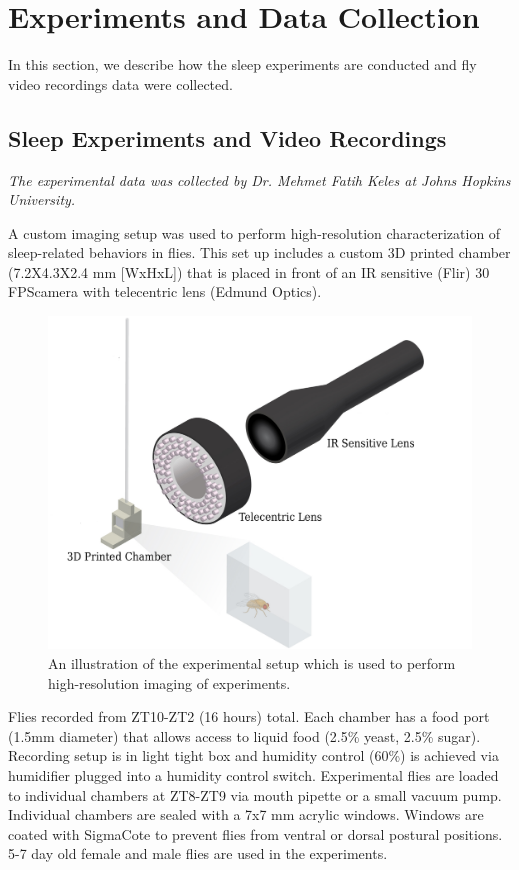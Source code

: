 \chapter{Experiments and Data Collection}\label{chapter:expt-data-collection}
In this section, we describe how the sleep experiments are conducted and fly video recordings data were collected.

\section{Sleep Experiments and Video Recordings}

\textit{The experimental data was collected by Dr. Mehmet Fatih Keles at Johns Hopkins University.}

A custom imaging setup was used to perform high-resolution characterization of sleep-related behaviors in flies. This set up includes a custom 3D printed chamber (7.2X4.3X2.4 mm [WxHxL]) that is placed in front of an IR sensitive (Flir) 30 FPScamera with telecentric lens (Edmund Optics).

\begin{figure}[ht!]
	\centering
	\includegraphics[width=0.75\linewidth]{figures/ExperimentalSetup.pdf}
	\caption[An illustration of the experimental setup which is used to perform high-resolution imaging of experiments.]{An illustration of the experimental setup which is used to perform high-resolution imaging of experiments.}
\end{figure}

Flies recorded from ZT10-ZT2 (16 hours) total.
Each chamber has a food port (1.5mm diameter) that allows access to liquid food (2.5\% yeast, 2.5\% sugar).
Recording setup is in light tight box and humidity control (60\%) is achieved via humidifier plugged into a humidity control switch. Experimental flies are loaded to individual chambers at ZT8-ZT9 via mouth pipette or a small vacuum pump.
Individual chambers are sealed with a 7x7 mm acrylic windows.
Windows are coated with SigmaCote to prevent flies from ventral or dorsal postural positions. 5-7 day old female and male flies are used in the experiments.

